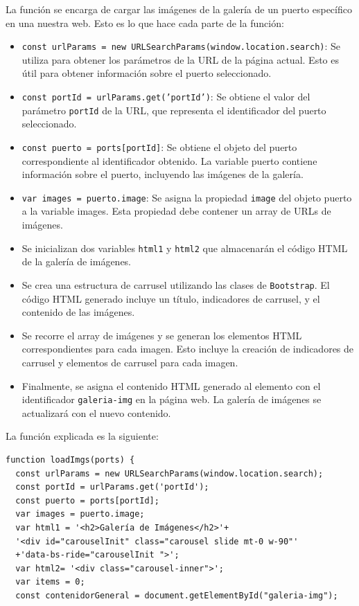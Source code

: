 \documentclass{article}
\begin{document}
\begin{itemize}
    La función se encarga de cargar las imágenes de la galería de un puerto específico en una nuestra web. Esto es lo que hace cada parte de la función:
    \begin{itemize}
      \item \texttt{const urlParams = new URLSearchParams(window.location.search)}: Se utiliza para obtener los parámetros de la URL de la página actual. Esto es útil para obtener información sobre el puerto seleccionado.
      \item \texttt{const portId = urlParams.get('portId')}: Se obtiene el valor del parámetro \texttt{portId} de la URL, que representa el identificador del puerto seleccionado.
      \item \texttt{const puerto = ports[portId]}: Se obtiene el objeto del puerto correspondiente al identificador obtenido. La variable puerto contiene información sobre el puerto, incluyendo las imágenes de la galería.
      \item \texttt{var images = puerto.image}: Se asigna la propiedad \texttt{image} del objeto puerto a la variable images. Esta propiedad debe contener un array de URLs de imágenes.
      \item Se inicializan dos variables \texttt{html1} y \texttt{html2} que almacenarán el código HTML de la galería de imágenes.
      \item Se crea una estructura de carrusel utilizando las clases de \texttt{Bootstrap}. El código HTML generado incluye un título, indicadores de carrusel, y el contenido de las imágenes.
      \item Se recorre el array de imágenes y se generan los elementos HTML correspondientes para cada imagen. Esto incluye la creación de indicadores de carrusel y elementos de carrusel para cada imagen.
      \item Finalmente, se asigna el contenido HTML generado al elemento con el identificador \texttt{galeria-img} en la página web. La galería de imágenes se actualizará con el nuevo contenido.
    \end{itemize}

    La función explicada es la siguiente:
    \begin{verbatim}
function loadImgs(ports) {
  const urlParams = new URLSearchParams(window.location.search);
  const portId = urlParams.get('portId');
  const puerto = ports[portId];
  var images = puerto.image;
  var html1 = '<h2>Galería de Imágenes</h2>'+
  '<div id="carouselInit" class="carousel slide mt-0 w-90"' 
  +'data-bs-ride="carouselInit ">';
  var html2= '<div class="carousel-inner">';
  var items = 0;
  const contenidorGeneral = document.getElementById("galeria-img");


\end{verbatim}
\end{itemize}
\end{document}

